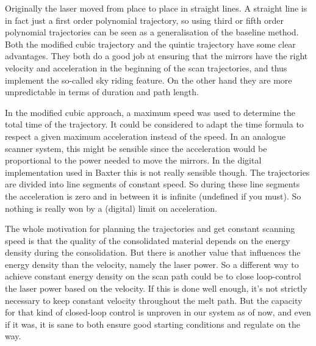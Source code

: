 Originally the laser moved from place to place in straight lines. A straight line is in fact just a first order polynomial trajectory, so using third or fifth order polynomial trajectories can be seen as a generalisation of the baseline method. Both the modified cubic trajectory and the quintic trajectory have some clear advantages. They both do a good job at ensuring that the mirrors have the right velocity and acceleration in the beginning of the scan trajectories, and thus implement the so-called sky riding feature. On the other hand they are more unpredictable in terms of duration and path length.

In the modified cubic approach, a maximum speed was used to determine the total time of the trajectory. It could be considered to adapt the time formula to respect a given maximum acceleration instead of the speed. In an analogue scanner system, this might be sensible since the acceleration would be proportional to the power needed to move the mirrors. In the digital implementation used in Baxter this is not really sensible though. The trajectories are divided into line segments of constant speed. So during these line segments the acceleration is zero and in between it is infinite (undefined if you must). So nothing is really won by a (digital) limit on acceleration.

The whole motivation for planning the trajectories and get constant scanning speed is that the quality of the consolidated material depends on the energy density during the consolidation. But there is another value that influences the energy density than the velocity, namely the laser power. So a different way to achieve constant energy density on the scan path could be to close loop-control the laser power based on the velocity. If this is done well enough, it's not strictly necessary to keep constant velocity throughout the melt path. But the capacity for that kind of closed-loop control is unproven in our system as of now, and even if it was, it is sane to both ensure good starting conditions and regulate on the way.

